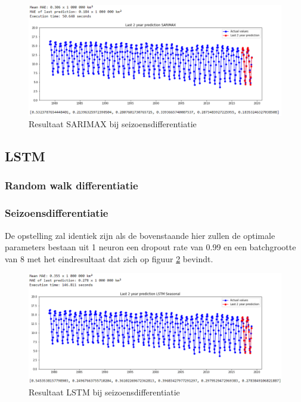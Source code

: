 \begin{figure}
    \centering
    \caption{Resultaat SARIMAX bij seizoensdifferentiatie}
    \label{fig:uvssarimaxsdiff}
    \includegraphics[width=1\linewidth]{uv_s_sarimax_s_diff}
\end{figure}

\subsection{LSTM}
\subsubsection{Random walk differentiatie}


\subsubsection{Seizoensdifferentiatie}

De opstelling zal identiek zijn als de bovenstaande hier zullen de optimale parameters bestaan uit 1 neuron een dropout rate van 0.99 en een batchgrootte van 8 met het eindresultaat dat zich op figuur \ref{fig:uvslstmsdiff} bevindt.

\begin{figure}
    \centering
    \caption{Resultaat LSTM bij seizoensdifferentiatie}
    \label{fig:uvslstmsdiff}
    \includegraphics[width=1\linewidth]{uv_s_lstm_s_diff}
\end{figure}

